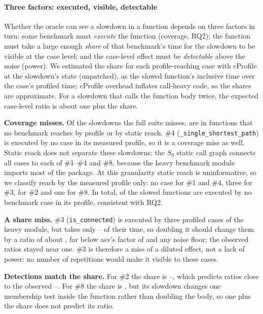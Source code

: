\paragraph*{Three factors: executed, visible, detectable}
Whether the oracle can see a slowdown in a function depends on three factors in turn: some benchmark must \emph{execute} the function (coverage, RQ2); the function must take a large enough \emph{share} of that benchmark's time for the slowdown to be visible at the case level; and the case-level effect must be \emph{detectable} above the noise (power).
We estimated the share for each profile-reaching case with cProfile at the slowdown's state (unpatched), as the slowed function's inclusive time over the case's profiled time; cProfile overhead inflates call-heavy code, so the shares are approximate.
For a slowdown that calls the function body twice, the expected case-level ratio is about one plus the share.

\textbf{Coverage misses.} Of the \SlowMissed{} slowdowns the full suite misses, \SlowMissedUnreached{} are in functions that no benchmark reaches by profile or by static reach.
\#4 (\texttt{\_single\_shortest\_path}) is executed by no case in its measured profile, so it is a coverage miss as well.
Static reach does not separate these slowdowns: the $S_0$ static call graph connects all \NxBenchCases{} cases to each of \#1--\#4 and \#8, because the heavy benchmark module imports most of the package.
At this granularity static reach is uninformative, so we classify reach by the measured profile only: no case for \#1 and \#4, three for \#3, \SlowTwoCases{} for \#2 and one for \#8.
In total, \SlowUnreachedProfile{} of the \NumSlowdowns{} slowed functions are executed by no benchmark case in its profile, consistent with RQ2.

\textbf{A share miss.} \#3 (\texttt{is\_connected}) is executed by three profiled cases of the heavy module, but takes only \ShareThreeLo--\ShareThreeHi{} of their time, so doubling it should change them by a ratio of about \ExpThree, far below asv's factor of \AsvFactor{} and any noise floor; the observed ratios stayed near one.
\#3 is therefore a miss of a diluted effect, not a lack of power: no number of repetitions would make it visible to these cases.

\textbf{Detections match the share.} For \#2 the share is \ShareTwoLo--\ShareTwoHi, which predicts ratios close to the observed \SlowTwoRatioLo--\SlowTwoRatioHi.
For \#8 the share is \ShareEight, but its slowdown changes one membership test inside the function rather than doubling the body, so one plus the share does not predict its ratio.

